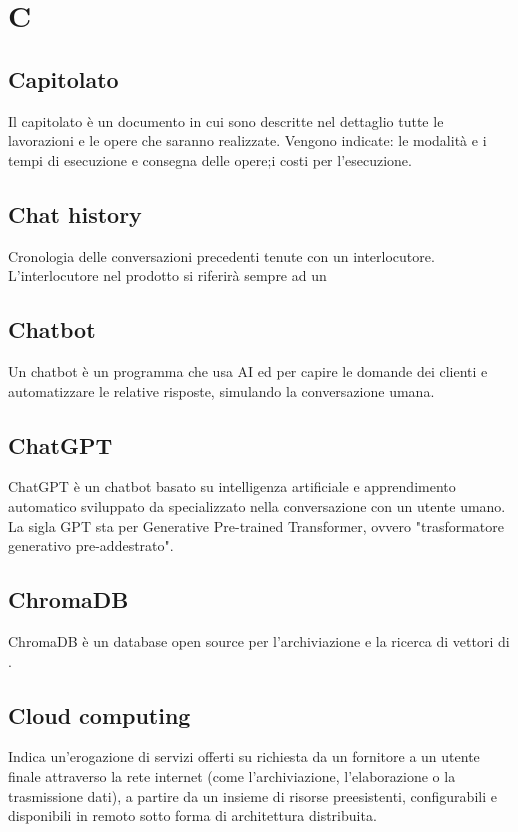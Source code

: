 \chapter{C}

\section{Capitolato}\label{sec:Capitolati}
Il capitolato è un documento in cui sono descritte nel dettaglio tutte le lavorazioni e le opere che saranno realizzate. Vengono indicate: le modalità e i tempi di esecuzione e consegna delle opere;i costi per l'esecuzione.

\section{Chat history}
Cronologia delle conversazioni precedenti tenute con un interlocutore. L'interlocutore nel prodotto si riferirà sempre ad un 

\section{Chatbot}
Un chatbot è un programma che usa AI ed  per capire le domande dei clienti e automatizzare le relative risposte, simulando la conversazione umana.

\section{ChatGPT}
ChatGPT è un chatbot basato su intelligenza artificiale e apprendimento automatico sviluppato da  specializzato nella conversazione con un utente umano. La sigla GPT sta per Generative Pre-trained Transformer, ovvero "trasformatore generativo pre-addestrato". 

\section{ChromaDB}\label{sec:Chroma}
ChromaDB è un database open source per l'archiviazione e la ricerca di vettori di .

\section{Cloud computing}\label{sec:Cloud}
Indica un'erogazione di servizi offerti su richiesta da un fornitore a un utente finale attraverso la rete internet (come l'archiviazione, l'elaborazione o la trasmissione dati), a partire da un insieme di risorse preesistenti, configurabili e disponibili in remoto sotto forma di architettura distribuita.

